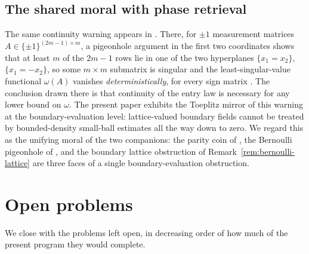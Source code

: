 \documentclass[11pt]{amsart}
\numberwithin{equation}{section}
\theoremstyle{definition}
\theoremstyle{remark}
\begin{document}
\subsection{The shared moral with phase retrieval}
The same continuity warning appears in \cite{PhaseRetrieval}. There, for $\pm1$ measurement matrices $A\in\{\pm1\}^{(2m-1)\times m}$, a pigeonhole argument in the first two coordinates shows that at least $m$ of the $2m-1$ rows lie in one of the two hyperplanes $\{x_1=x_2\}$, $\{x_1=-x_2\}$, so some $m\times m$ submatrix is singular and the least-singular-value functional $\omega(A)$ vanishes \emph{deterministically}, for every sign matrix \cite[Rem.~6.2]{PhaseRetrieval}. The conclusion drawn there is that continuity of the entry law is necessary for any lower bound on $\omega$. The present paper exhibits the Toeplitz mirror of this warning at the boundary-evaluation level: lattice-valued boundary fields cannot be treated by bounded-density small-ball estimates all the way down to zero. We regard this as the unifying moral of the two companions: the parity coin of \cite{Parity}, the Bernoulli pigeonhole of \cite{PhaseRetrieval}, and the boundary lattice obstruction of Remark~\ref{rem:bernoulli-lattice} are three faces of a single boundary-evaluation obstruction.

\section{Open problems}\label{sec:open}

We close with the problems left open, in decreasing order of how much of the present program they would complete.
\end{document}
